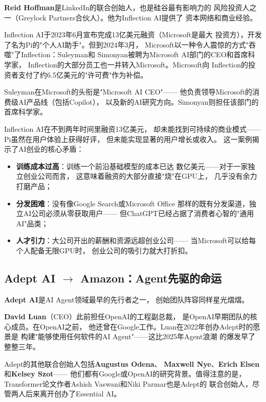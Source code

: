 \textbf{Reid Hoffman}是LinkedIn的联合创始人，也是硅谷最有影响力的
风险投资人之一（Greylock Partners合伙人）。他为Inflection AI提供了
资本网络和商业经验。

Inflection AI于2023年6月宣布完成13亿美元融资（Microsoft是最大
投资方），开发了名为Pi的"个人AI助手"。但到2024年3月，
Microsoft以一种令人震惊的方式"吞噬"了Inflection：Suleyman和
Simonyan被聘为Microsoft AI部门的CEO和首席科学家，
Inflection的大部分员工也一并转入Microsoft。Microsoft向
Inflection的投资者支付了约6.5亿美元的"许可费"作为补偿。

Suleyman在Microsoft的头衔是"Microsoft AI CEO"——
他负责领导Microsoft的消费级AI产品线（包括Copilot），
以及新的AI研究方向。Simonyan则担任该部门的首席科学家。

\begin{whybox}[Inflection的失败说明了什么？]
Inflection AI在不到两年时间里融资13亿美元，
却未能找到可持续的商业模式——Pi虽然在用户体验上获得好评，
但未能实现显著的用户增长或收入。
这一案例揭示了AI创业的核心矛盾：
\begin{itemize}
  \item \textbf{训练成本过高}：训练一个前沿基础模型的成本已达
    数亿美元——对于一家独立创业公司而言，
    这意味着融资的大部分直接"烧"在GPU上，
    几乎没有余力打磨产品；
  \item \textbf{分发困难}：没有像Google Search或Microsoft Office
    那样的既有分发渠道，独立AI公司必须从零获取用户——
    但ChatGPT已经占据了消费者心智的"通用AI"品类；
  \item \textbf{人才引力}：大公司开出的薪酬和资源远超创业公司——
    当Microsoft可以给每个人配备无限GPU时，
    创业公司的吸引力就大打折扣。
\end{itemize}
\end{whybox}

\subsection{Adept AI $\to$ Amazon：Agent先驱的命运}

\textbf{Adept AI}是AI Agent领域最早的先行者之一，
创始团队阵容同样星光熠熠。

\textbf{David Luan}（CEO）此前担任OpenAI的工程副总裁，
是OpenAI早期团队的核心成员。在OpenAI之前，
他还曾在Google工作。Luan在2022年创办Adept时的愿景是
构建"能够使用任何软件的AI Agent"——这比2025年Agent浪潮
的爆发早了整整三年。

Adept的其他联合创始人包括\textbf{Augustus Odena}、
\textbf{Maxwell Nye}、\textbf{Erich Elsen}和\textbf{Kelsey Szot}——
他们都有Google或OpenAI的研究背景。值得注意的是，
Transformer论文作者Ashish Vaswani和Niki Parmar也是Adept的
联合创始人，尽管两人后来离开创办了Essential AI。

